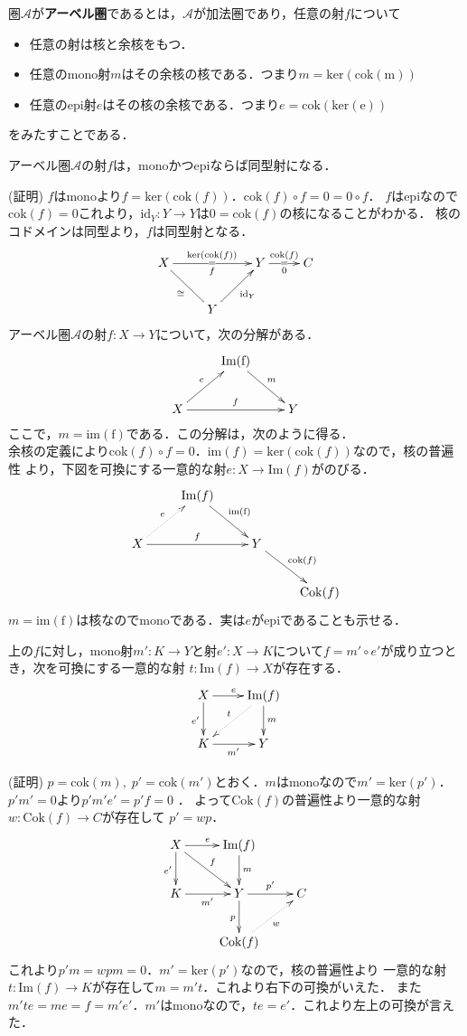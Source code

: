 \begin{defi}
圏$\mathcal{A}$が{\bf アーベル圏}であるとは，$\mathcal{A}$が加法圏であり，任意の射$f$について
\begin{itemize}
\item 任意の射は核と余核をもつ．
\item 任意のmono射$m$はその余核の核である．つまり$m = \mathrm{ker}(\mathrm{cok(m)})$
\item 任意のepi射$e$はその核の余核である．つまり$e = \mathrm{cok}(\mathrm{ker(e)})$
\end{itemize}
をみたすことである．

\end{defi} \proofend

\begin{prop}
アーベル圏$\mathcal{A}$の射$f$は，monoかつepiならば同型射になる．
\end{prop}
(証明) $f$はmonoより$ f = \mathrm{ker}(\mathrm{cok}(f))$．$\mathrm{cok}(f) \circ f = 0 = 0 \circ f$．
$f$はepiなので$\mathrm{cok}(f) = 0$これより，$\mathrm{id}_Y:Y \to Y$は$0 = \mathrm{cok}(f)$の核になることがわかる．
核のコドメインは同型より，$f$は同型射となる．
\[
\xymatrix{
X \ar[rr]^{\mathrm{ker}(\mathrm{cok}(f))}_{f} | = && Y\ar[r]_{0}^{\mathrm{cok}(f)} | = & C  \\
&Y \ar@{-}[ul]^{\cong} \ar[ur]_{\mathrm{id}_Y}
}
\]
\proofend
アーベル圏$\mathcal{A}$の射$f : X \to Y$について，次の分解がある．
\[
\xymatrix{
&\mathrm{Im(f)} \ar[rd]^m  \\
X\ar[ru]^e \ar[rr]^f  && Y
}
\]
ここで，$m=\mathrm{im(f)}$である．この分解は，次のように得る．\\
余核の定義により$\mathrm{cok}(f) \circ f = 0$．$\mathrm{im}(f) = \mathrm{ker}(\mathrm{cok}(f))$なので，核の普遍性
より，下図を可換にする一意的な射$e: X \to \mathrm{Im}(f)$がのびる．
\[
\xymatrix{
&\mathrm{Im}(f) \ar[rd]^{\mathrm{im(f)}} \\
X\ar@{.>}[ru]^e \ar[rr]^f  && Y \ar[rd]^{\mathrm{cok}(f)} \\
&&& \mathrm{Cok}(f)
}
\]
$m=\mathrm{im(f)}$は核なのでmonoである．実は$e$がepiであることも示せる．
\begin{lem}
上の$f$に対し，mono射$m': K \to Y$と射$e': X \to K$について$f=m' \circ e'$が成り立つとき，次を可換にする一意的な射
$t :\mathrm{Im}(f) \to X$が存在する．
\[
\xymatrix{
X \ar[d]_{e'} \ar[r]^{e} & \mathrm{Im}(f) \ar[d]^m  \ar@{.>}[ld]_t\\
K \ar[r]_{m'} & Y
}
\]
\end{lem}
(証明) 
$p = \mathrm{cok}(m) ,\;p' = \mathrm{cok}(m')$とおく．$m$はmonoなので$m' = \mathrm{ker}(p')$．
$p'  m' = 0$より$p'  m'  e' = p'  f = 0$ ．
よって$\mathrm{Cok}(f)$の普遍性より一意的な射$w : \mathrm{Cok}(f) \to C$が存在して
$p' = w p$．
\[
\xymatrix{
X \ar[d]_{e'} \ar[r]^e \ar[rd]^f 	& \mathrm{Im}(f)  \ar[d]^m  \\
K \ar[r]_{m'} 				& Y \ar[r]^{p'} \ar[d]_{p} &	C \\
						& \mathrm{Cok}(f) \ar@{.>}[ru]_w
}
\]
これより$p'  m = w  p  m = 0$．$m' = \mathrm{ker}(p')$なので，核の普遍性より
一意的な射$t:\mathrm{Im}(f) \to K$が存在して$m = m't$．これより右下の可換がいえた．
また$m'te = me = f = m'e'$．$m'$はmonoなので，$te = e'$．これより左上の可換が言えた．
\proofend

